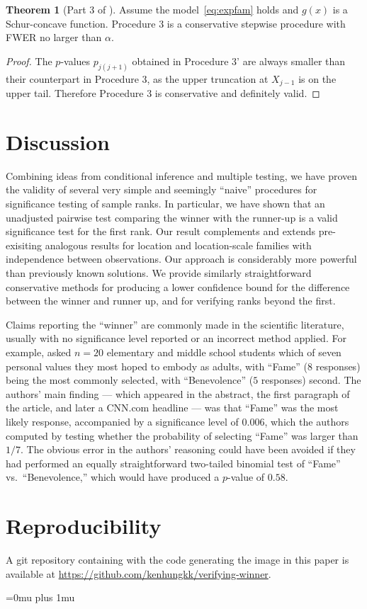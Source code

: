 \documentclass[aos, authoryear]{imsart}
\theoremstyle{definition}
\theoremstyle{custom}
\newtheorem*{customthm}{Theorem}
\begin{document}
\begin{customthm}[Part 3 of ]
Assume the model~\eqref{eq:expfam} holds and $g\left(x\right)$ is a Schur-concave function. Procedure 3 is a conservative stepwise procedure with FWER no larger than $\alpha$.
\end{customthm}

\begin{proof}
The $p$-values $p_{j\left(j+1\right)}$ obtained in Procedure 3' are always smaller than their counterpart in Procedure 3, as the upper truncation at $X_{j-1}$ is on the upper tail. Therefore Procedure 3 is conservative and definitely valid.
\end{proof}

\section{Discussion}
\label{sec:disc}

Combining ideas from conditional inference and multiple testing, we have proven the validity of several very simple and seemingly ``naive'' procedures for significance testing of sample ranks. In particular, we have shown that an unadjusted pairwise test comparing the winner with the runner-up is a valid significance test for the first rank. Our result complements and extends pre-exisiting analogous results for location and location-scale families with independence between observations. Our approach is considerably more powerful than previously known solutions. We provide similarly straightforward conservative methods for producing a lower confidence bound for the difference between the winner and runner up, and for verifying ranks beyond the first.

Claims reporting the ``winner'' are commonly made in the scientific literature, usually with no significance level reported or an incorrect method applied. For example, \citet{Uhls:2012gf} asked $n = 20$ elementary and middle school students which of seven personal values they most hoped to embody as adults, with ``Fame'' ($8$ responses) being the most commonly selected, with ``Benevolence'' ($5$ responses) second. The authors' main finding --- which appeared in the abstract, the first paragraph of the article, and later a CNN.com headline \citep{Alikhani:2011} --- was that ``Fame'' was the most likely response, accompanied by a significance level of $0.006$, which the authors computed by testing whether the probability of selecting ``Fame'' was larger than $1 / 7$. The obvious error in the authors' reasoning could have been avoided if they had performed an equally straightforward two-tailed binomial test of ``Fame'' vs.\ ``Benevolence,'' which would have produced a $p$-value of $0.58$.

\section*{Reproducibility}
A git repository containing with the code generating the image in this paper is available at \url{https://github.com/kenhungkk/verifying-winner}.

\Urlmuskip=0mu plus 1mu\relax


\end{document}
